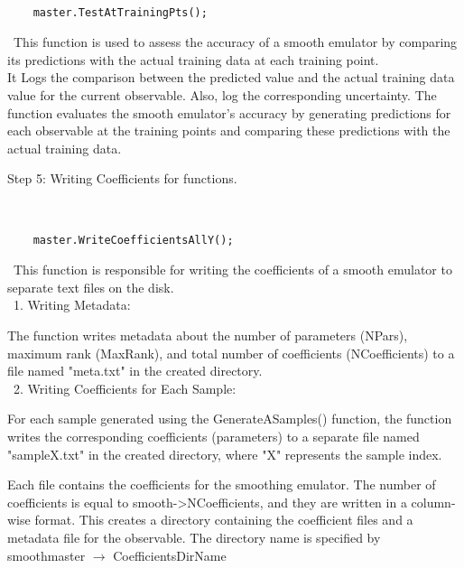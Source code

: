 \documentclass[12pt]{article}
\numberwithin{equation}{section}
\numberwithin{figure}{section}
\begin{document}
{\tt 
\begin{verbatim}
    master.TestAtTrainingPts(); 
\end{verbatim}
}

\ This function is used to assess the accuracy of a smooth emulator by comparing its predictions with the actual training data at each training point. \\ 

It Logs the comparison between the predicted value and the actual training data value for the current observable. Also, log the corresponding uncertainty. The function evaluates the smooth emulator's accuracy by generating predictions for each observable at the training points and comparing these predictions with the actual training data. \\ 

\begin{description}
\item[Step 5: Writing Coefficients for functions. ]
\end{description}

{\tt 
\begin{verbatim}
    master.WriteCoefficientsAllY(); 
\end{verbatim}
}

\ This function is responsible for writing the coefficients of a smooth emulator to separate text files on the disk. \\

\ 1. Writing Metadata:

The function writes metadata about the number of parameters (NPars), maximum rank (MaxRank), and total number of coefficients (NCoefficients) to a file named "meta.txt" in the created directory. \\

\ 2. Writing Coefficients for Each Sample:

For each sample generated using the GenerateASamples() function, the function writes the corresponding coefficients (parameters) to a separate file named "sampleX.txt" in the created directory, where "X" represents the sample index. 

Each file contains the coefficients for the smoothing emulator. The number of coefficients is equal to smooth->NCoefficients, and they are written in a column-wise format. This creates a directory containing the coefficient files and a metadata file for the observable. The directory name is specified by smoothmaster $\rightarrow$ CoefficientsDirName \\
\end{document}
